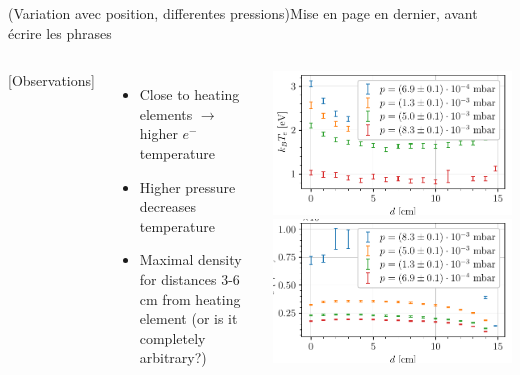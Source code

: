 \documentclass[10pt]{beamer}
\begin{document}
\begin{frame}{(Variation avec position, differentes pressions)}{Mise en page en dernier, avant écrire les phrases}
    \begin{columns}
        [Observations]

        \begin{itemize}
            \item Close to heating elements \(\rightarrow\) higher \(e^-\) temperature
            \item Higher pressure decreases temperature
            \item Maximal density for distances 3-6 cm from heating element (or is it completely arbitrary?)
        \end{itemize}

        \centering
        \includegraphics[scale=1]{../figures/temperatureeV_position.pdf}
        \includegraphics[scale=1]{../figures/density_position.pdf}
    \end{columns}
\end{frame}
    
\end{document}
